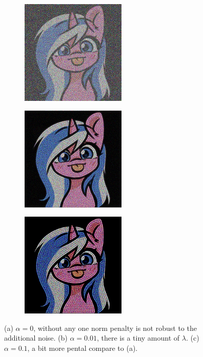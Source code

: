 \documentclass[]{article}
\theoremstyle{definition}
\begin{document}
        \begin{figure}[H]
            \centering
            \begin{subfigure}{0.31\textwidth}
                \includegraphics[width=5cm]{inverse_linear_experiment1-soln_img.jpg}
                \caption{} \label{fig:1a}
            \end{subfigure}     %
            \hspace*{\fill}     %
            \begin{subfigure}{0.31\textwidth}
                \includegraphics[width=5cm]{inverse_linear_experiment2-soln_img.jpg}
                \caption{} \label{fig:1b}
            \end{subfigure}     %
            \hspace*{\fill}     %
            \begin{subfigure}{0.31\textwidth}
                \includegraphics[width=5cm]{inverse_linear_experiment3-soln_img.jpg}
                \caption{} \label{fig:1c}
            \end{subfigure}
            \caption{(a) $\alpha = 0$, without any one norm penalty is not robust to the additional noise. (b) $\alpha = 0.01$, there is a tiny amount of $\lambda$. (c) $\alpha = 0.1$, a bit more pental compare to (a).}
            \label{fig:3}
        \end{figure}
\end{document}
